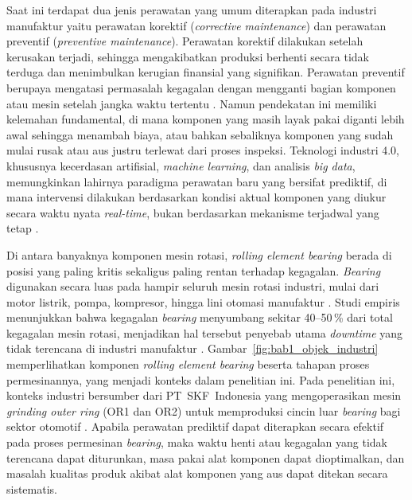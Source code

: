 Saat ini terdapat dua jenis perawatan yang umum diterapkan pada industri
manufaktur yaitu perawatan korektif (\emph{corrective maintenance}) dan perawatan
preventif (\emph{preventive maintenance}). 
Perawatan korektif dilakukan setelah kerusakan terjadi, sehingga
mengakibatkan produksi berhenti secara tidak terduga dan menimbulkan kerugian
finansial yang signifikan.
Perawatan preventif berupaya mengatasi permasalah kegagalan dengan mengganti bagian komponen atau mesin setelah
jangka waktu tertentu .
Namun pendekatan ini memiliki kelemahan fundamental, di mana komponen yang masih
layak pakai diganti lebih awal sehingga menambah biaya, atau bahkan sebaliknya
komponen yang sudah mulai rusak atau aus justru terlewat dari proses inspeksi.
Teknologi industri 4.0, khususnya kecerdasan artifisial, \emph{machine learning},
dan analisis \emph{big data}, memungkinkan lahirnya paradigma perawatan baru
yang bersifat prediktif, di mana intervensi dilakukan berdasarkan kondisi
aktual komponen yang diukur secara waktu nyata \emph{real-time}, bukan berdasarkan mekanisme terjadwal
yang tetap .

Di antara banyaknya komponen mesin rotasi, \emph{rolling element bearing}
berada di posisi yang paling kritis sekaligus paling rentan terhadap kegagalan.
\emph{Bearing} digunakan secara luas pada hampir seluruh mesin rotasi
industri, mulai dari motor listrik, pompa, kompresor, hingga lini otomasi
manufaktur .
Studi empiris menunjukkan bahwa kegagalan \emph{bearing} menyumbang sekitar
40--50\,\% dari total kegagalan mesin rotasi, menjadikan hal tersebut penyebab utama
\emph{downtime} yang tidak terencana di industri manufaktur
.
Gambar~\ref{fig:bab1_objek_industri} memperlihatkan komponen \emph{rolling
element bearing} beserta tahapan proses {\color{blue}permesinannya}, yang menjadi konteks dalam penelitian ini.
Pada penelitian ini, konteks industri bersumber dari PT~SKF~Indonesia yang
mengoperasikan mesin \emph{grinding outer ring} (OR1 dan OR2) untuk
memproduksi cincin luar \emph{bearing} bagi sektor otomotif
.
Apabila perawatan prediktif dapat diterapkan secara efektif pada proses
permesinan \emph{bearing}, maka waktu henti atau kegagalan yang tidak terencana dapat
diturunkan, masa pakai alat komponen dapat dioptimalkan, dan masalah kualitas
produk akibat alat komponen yang aus dapat ditekan secara sistematis.

